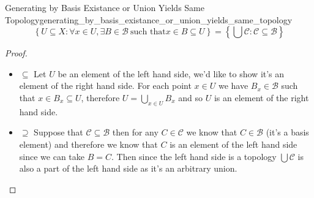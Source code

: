 \begin{proposition}
{Generating by Basis Existance or Union Yields Same
Topology}{generating_by_basis_existance_or_union_yields_same_topology}
\[
\left\{U \subseteq X: \forall x \in U, \exists B \in \mathcal{B}
~\text{such that} x \in B \subseteq U \right\} = \left\{\bigcup \mathcal{C} :
\mathcal{C} \subseteq \mathcal{B} \right\}
\]
\end{proposition}
\begin{proof}
    \begin{itemize}
        \item \(\subseteq \) Let \(U \) be an element of the left hand side,
        we'd like to show it's an element of the right hand side. For each point
        \( x \in  U \) we have \( B _{ x } \in \mathcal{ B }   \) such that \( x
        \in B _{ x } \subseteq U\), therefore \( U = \bigcup _{ x \in  U } B _{
        x}  \) and so \( U \) is an element of the right hand side.
        \item \(\supseteq \) Suppose that \(\mathcal{C} \subseteq \mathcal{B} \)
        then for any \(C \in \mathcal{C} \) we know that \(C \in \mathcal{
        B} \) (it's a basis element) and therefore we know that \(C \) is an
        element of the left hand side since we can take \(B = C \). Then since
        the left hand side is a topology \(\bigcup \mathcal{C} \) is also a
        part of the left hand side as it's an arbitrary union.
    \end{itemize}
\end{proof}
